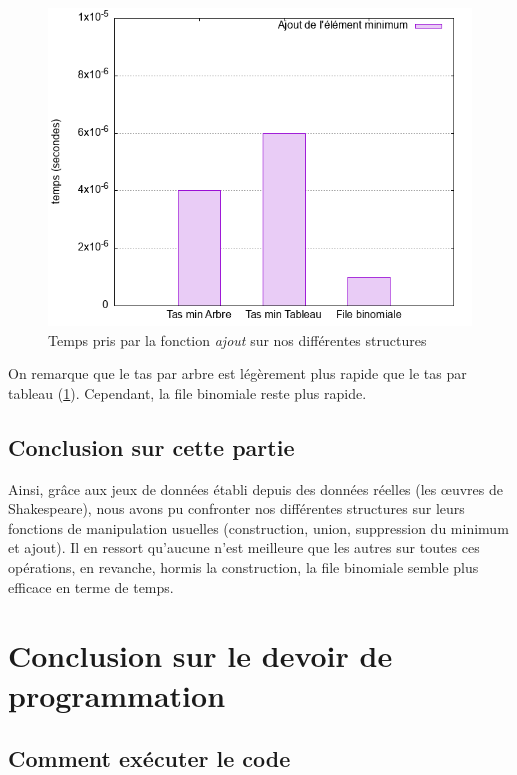 \documentclass[12pt,a4paper]{article}
\begin{document}
\begin{figure}[hbtp]
\centering
\includegraphics[scale=0.5]{../Images/svg courbes pour rapport/temps_ajout_shakespeare.png}
\caption{Temps pris par la fonction \textit{ajout} sur nos différentes structures}
\label{fig12}
\end{figure}

On remarque que le tas par arbre est légèrement plus rapide que le tas par tableau (\ref{fig12}). Cependant, la file binomiale reste plus rapide.


\subsection{Conclusion sur cette partie}

Ainsi, grâce aux jeux de données établi depuis des données réelles (les œuvres de Shakespeare), nous avons pu confronter nos différentes structures sur leurs fonctions de manipulation usuelles (construction, union, suppression du minimum et ajout). Il en ressort qu'aucune n'est meilleure que les autres sur toutes ces opérations, en revanche, hormis la construction, la file binomiale semble plus efficace en terme de temps.

\newpage

 \section{Conclusion sur le devoir de programmation}
 

\subsection{Comment exécuter le code}
\end{document}
